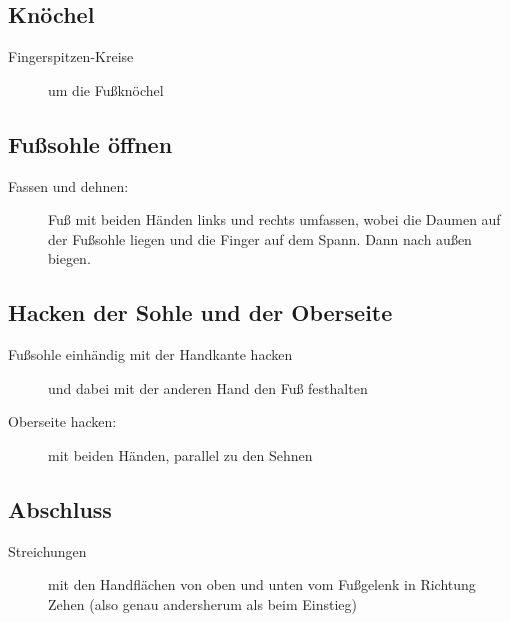 \subsection{Knöchel}
\begin{description}
  \item[Fingerspitzen-Kreise] um die Fußknöchel
\end{description}

\subsection{Fußsohle öffnen}
\begin{description}
  \item[Fassen und dehnen:] Fuß mit beiden Händen links und rechts umfassen, wobei die Daumen auf der Fußsohle liegen und die Finger auf dem Spann. Dann nach außen biegen.
\end{description}


\subsection{Hacken der Sohle und der Oberseite}
\begin{description}
  \item[Fußsohle einhändig mit der Handkante hacken] und dabei mit der anderen Hand den Fuß festhalten
  \item[Oberseite hacken:] mit beiden Händen, parallel zu den Sehnen
\end{description}

\subsection{Abschluss}
\begin{description}
  \item[Streichungen] mit den Handflächen von oben und unten vom Fußgelenk in Richtung Zehen (also genau andersherum als beim Einstieg)
\end{description}
